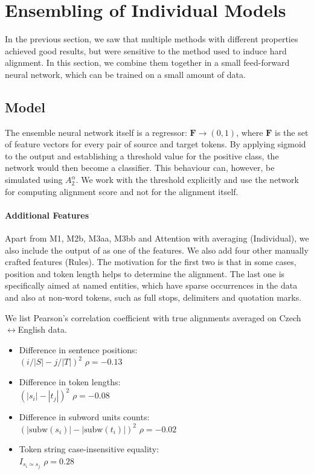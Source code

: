 \section{Ensembling of Individual Models} \label{sec:aggregated}

In the previous section, we saw that multiple methods with different properties achieved good results, but were sensitive to the method used to induce hard alignment. In this section, we combine them together in a small feed-forward neural network, which can be trained on a small amount of data.

\subsection{Model}

The ensemble neural network itself is a regressor: $\mathbf{F} \rightarrow (0, 1)$, where $\mathbf{F}$ is the set of feature vectors for every pair of source and target tokens. By applying sigmoid to the output and establishing a threshold value for the positive class, the network would then become a classifier. This behaviour can, however, be simulated using $A_2^\alpha$. We work with the threshold explicitly and use the network for computing alignment score and not for the alignment itself.

\paragraph{Additional Features} Apart from M1, M2b, M3aa, M3bb and Attention with averaging (Individual), we also include the output of \fastalign{} as one of the features. We also add four other manually crafted features (Rules). The motivation for the first two is that in some cases, position and token length helps to determine the alignment. The last one is specifically aimed at named entities, which have sparse occurrences in the data and also at non-word tokens, such as full stops, delimiters and quotation marks. 

We list Pearson's correlation coefficient with true alignments averaged on Czech$\leftrightarrow$English data.

\begin{itemize}
    \item Difference in sentence positions:\\
    $(i/|S|-j/|T|)^2$ \hfill $\rho = -0.13$
    \item Difference in token lengths:\\
    $(|s_i|-|t_j|)^2$ \hfill $\rho = -0.08$
    \item Difference in subword units counts:\\
    $(|\text{subw}(s_i)|-|\text{subw}(t_i)|)^2$ \hfill $\rho = -0.02$
    \item Token string case-insensitive equality:\\
    $I_{s_i \simeq s_j}$ \hfill  $\rho =  0.28$
\end{itemize}

